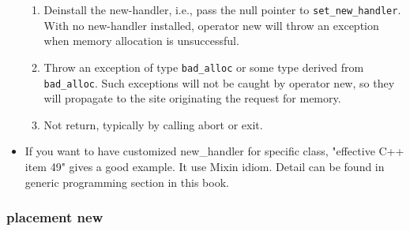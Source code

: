 \documentclass[a4paper,12pt,twoside]{book}
\begin{document}
\begin{itemize}
\begin{enumerate}
		\item Deinstall the new-handler, i.e., pass the null pointer to \texttt{set\_new\_handler}. With no new-handler installed, operator new will throw an exception when memory allocation is unsuccessful.
		
		\item Throw an exception of type \texttt{bad\_alloc} or some type derived from \texttt{bad\_alloc}. Such exceptions will not be caught by operator new, so they will propagate to the site originating the request for memory.
		
		\item Not return, typically by calling abort or exit.
	\end{enumerate}
	\item If you want to have customized new\_handler for specific class, "effective C++ item 49" gives a good example. It use Mixin idiom. Detail can be found in generic programming section in this book.
	
\end{itemize}
\subsubsection{placement new}
\end{document}
